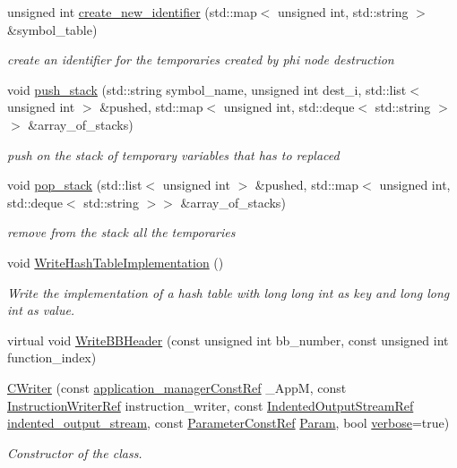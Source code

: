 \begin{DoxyCompactItemize}
unsigned int \hyperlink{classCWriter_a9eadef932300ac395a17c244453a580f}{create\+\_\+new\+\_\+identifier} (std\+::map$<$ unsigned int, std\+::string $>$ \&symbol\+\_\+table)
\begin{DoxyCompactList}\small\item\em create an identifier for the temporaries created by phi node destruction \end{DoxyCompactList}\item 
void \hyperlink{classCWriter_a5c0ed4b874e669318fef1e5976e24b52}{push\+\_\+stack} (std\+::string symbol\+\_\+name, unsigned int dest\+\_\+i, std\+::list$<$ unsigned int $>$ \&pushed, std\+::map$<$ unsigned int, std\+::deque$<$ std\+::string $>$$>$ \&array\+\_\+of\+\_\+stacks)
\begin{DoxyCompactList}\small\item\em push on the stack of temporary variables that has to replaced \end{DoxyCompactList}\item 
void \hyperlink{classCWriter_ab9ea6f81d49ce7fed0fa00ffc7e19219}{pop\+\_\+stack} (std\+::list$<$ unsigned int $>$ \&pushed, std\+::map$<$ unsigned int, std\+::deque$<$ std\+::string $>$$>$ \&array\+\_\+of\+\_\+stacks)
\begin{DoxyCompactList}\small\item\em remove from the stack all the temporaries \end{DoxyCompactList}\item 
void \hyperlink{classCWriter_a22766bb22fb01e96257b27095bf035ef}{Write\+Hash\+Table\+Implementation} ()
\begin{DoxyCompactList}\small\item\em Write the implementation of a hash table with long long int as key and long long int as value. \end{DoxyCompactList}\item 
virtual void \hyperlink{classCWriter_a60ced6c07b4f41a09acdae409615e24e}{Write\+B\+B\+Header} (const unsigned int bb\+\_\+number, const unsigned int function\+\_\+index)
\item 
\hyperlink{classCWriter_a22480a6c6f4c3b3bbb3efb886b5a724c}{C\+Writer} (const \hyperlink{application__manager_8hpp_abb985163a2a3fb747f6f03b1eaadbb44}{application\+\_\+manager\+Const\+Ref} \+\_\+\+AppM, const \hyperlink{instruction__writer_8hpp_a40ea26c38a2909ba48f88f997144b260}{Instruction\+Writer\+Ref} instruction\+\_\+writer, const \hyperlink{indented__output__stream_8hpp_ab32278e11151ef292759c88e99b77feb}{Indented\+Output\+Stream\+Ref} \hyperlink{classCWriter_ac6d016436e065c31dd5152a7cc30e507}{indented\+\_\+output\+\_\+stream}, const \hyperlink{Parameter_8hpp_a37841774a6fcb479b597fdf8955eb4ea}{Parameter\+Const\+Ref} \hyperlink{classCWriter_a3555d61ac3540440862ed211800b80be}{Param}, bool \hyperlink{classCWriter_a8d5b6fe4a045d7e9ca997a566274cdb5}{verbose}=true)
\begin{DoxyCompactList}\small\item\em Constructor of the class. \end{DoxyCompactList}\end{DoxyCompactItemize}
